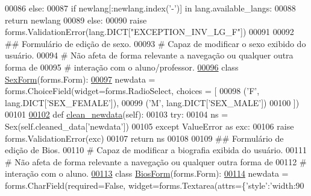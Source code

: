 \begin{DoxyCode}
00086         \textcolor{keywordflow}{else}:
00087             \textcolor{keywordflow}{if} newlang[:newlang.index(\textcolor{stringliteral}{'-'})] \textcolor{keywordflow}{in} lang.available\_langs:
00088                 \textcolor{keywordflow}{return} newlang
00089             \textcolor{keywordflow}{else}:
00090                 \textcolor{keywordflow}{raise} forms.ValidationError(lang.DICT[\textcolor{stringliteral}{"EXCEPTION\_INV\_LG\_F"}])
00091 
00092 \textcolor{comment}{## Formulário de edição de sexo.}
00093 \textcolor{comment}{#   Capaz de modificar o sexo exibido do usuário.}
00094 \textcolor{comment}{#   Não afeta de forma relevante a navegação ou qualquer outra forma de}
00095 \textcolor{comment}{#   interação com o aluno/professor.}
\hypertarget{Profile_2forms_8py_source_l00096}{}\hyperlink{classProfile_1_1forms_1_1SexForm}{00096} \textcolor{keyword}{class }\hyperlink{classProfile_1_1forms_1_1SexForm}{SexForm}(forms.Form):
\hypertarget{Profile_2forms_8py_source_l00097}{}\hyperlink{classProfile_1_1forms_1_1SexForm_a0d99412ab99ee46149a50fabb2614845}{00097}     newdata     = forms.ChoiceField(widget=forms.RadioSelect, choices = [
00098                                             (\textcolor{stringliteral}{'F'}, lang.DICT[\textcolor{stringliteral}{'SEX\_FEMALE'}]),
00099                                             (\textcolor{stringliteral}{'M'}, lang.DICT[\textcolor{stringliteral}{'SEX\_MALE'}])
00100                                                 ])
00101 
\hypertarget{Profile_2forms_8py_source_l00102}{}\hyperlink{classProfile_1_1forms_1_1SexForm_ac9ef4da0a6773535d0e94e332d20f9c3}{00102}     \textcolor{keyword}{def }\hyperlink{classProfile_1_1forms_1_1SexForm_ac9ef4da0a6773535d0e94e332d20f9c3}{clean\_newdata}(self):
00103         \textcolor{keywordflow}{try}:
00104             ns = Sex(self.cleaned\_data[\textcolor{stringliteral}{'newdata'}])
00105         \textcolor{keywordflow}{except} ValueError \textcolor{keyword}{as} exc:
00106             \textcolor{keywordflow}{raise} forms.ValidationError(exc)
00107         \textcolor{keywordflow}{return} ns
00108 
00109 \textcolor{comment}{## Formulário de edição de Bios.}
00110 \textcolor{comment}{#   Capaz de modificar a biografia exibida do usuário.}
00111 \textcolor{comment}{#   Não afeta de forma relevante a navegação ou qualquer outra forma de}
00112 \textcolor{comment}{#   interação com o aluno.}
\hypertarget{Profile_2forms_8py_source_l00113}{}\hyperlink{classProfile_1_1forms_1_1BiosForm}{00113} \textcolor{keyword}{class }\hyperlink{classProfile_1_1forms_1_1BiosForm}{BiosForm}(forms.Form):
\hypertarget{Profile_2forms_8py_source_l00114}{}\hyperlink{classProfile_1_1forms_1_1BiosForm_a2862b20c24bac9aa5dc896925a2cb3d6}{00114}     newdata     = forms.CharField(required=\textcolor{keyword}{False}, widget=forms.Textarea(attrs=\{\textcolor{stringliteral}{'style'}:\textcolor{stringliteral}{'width:90%
}
\end{DoxyCode}
